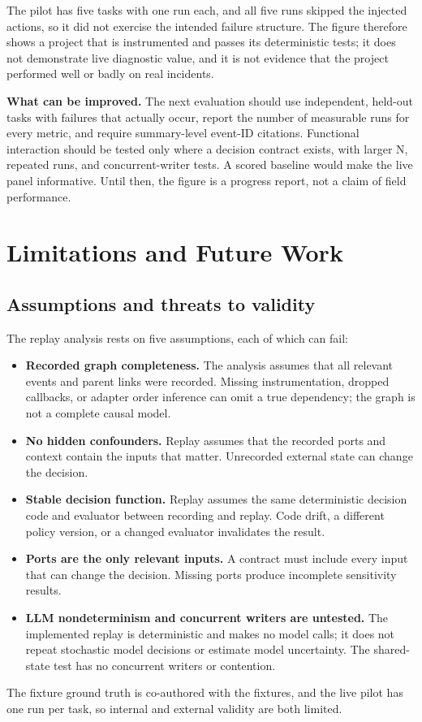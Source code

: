 \documentclass[11pt]{article}
\begin{document}
\vspace{1em}

The pilot has five tasks with one run each, and all five runs skipped the injected actions, so it did not exercise the intended failure structure. The figure therefore shows a project that is instrumented and passes its deterministic tests; it does not demonstrate live diagnostic value, and it is not evidence that the project performed well or badly on real incidents.

\vspace{1em}

\noindent\textbf{What can be improved.} The next evaluation should use independent, held-out tasks with failures that actually occur, report the number of measurable runs for every metric, and require summary-level event-ID citations. Functional interaction should be tested only where a decision contract exists, with larger N, repeated runs, and concurrent-writer tests. A scored baseline would make the live panel informative. Until then, the figure is a progress report, not a claim of field performance.

\section{Limitations and Future Work}\label{sec:limits}
\subsection{Assumptions and threats to validity}
The replay analysis rests on five assumptions, each of which can fail:
\begin{itemize}
\item \textbf{Recorded graph completeness.} The analysis assumes that all relevant events and parent links were recorded. Missing instrumentation, dropped callbacks, or adapter order inference can omit a true dependency; the graph is not a complete causal model.
\item \textbf{No hidden confounders.} Replay assumes that the recorded ports and context contain the inputs that matter. Unrecorded external state can change the decision.
\item \textbf{Stable decision function.} Replay assumes the same deterministic decision code and evaluator between recording and replay. Code drift, a different policy version, or a changed evaluator invalidates the result.
\item \textbf{Ports are the only relevant inputs.} A contract must include every input that can change the decision. Missing ports produce incomplete sensitivity results.
\item \textbf{LLM nondeterminism and concurrent writers are untested.} The implemented replay is deterministic and makes no model calls; it does not repeat stochastic model decisions or estimate model uncertainty. The shared-state test has no concurrent writers or contention.
\end{itemize}
The fixture ground truth is co-authored with the fixtures, and the live pilot has one run per task, so internal and external validity are both limited.
\end{document}
